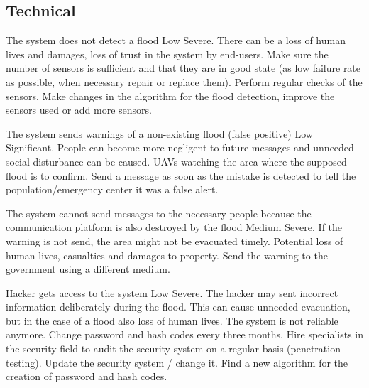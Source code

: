 \subsection{Technical}

{The system does not detect a flood}
{Low}
{Severe. There can be a loss of human lives and damages, loss of trust in the system by end-users.}
{Make sure the number of sensors is sufficient and that they are in good state (as low failure rate as possible, when necessary repair or replace them). Perform regular checks of the sensors.}
{Make changes in the algorithm for the flood detection, improve the sensors used or add more sensors.}

{The system sends warnings of a non-existing flood (false positive)} %
{Low}
{Significant. People can become more negligent to future messages and unneeded social disturbance can be caused.}
{UAVs watching the area where the supposed flood is to confirm.}
{Send a message as soon as the mistake is detected to tell the population/emergency center it was a false alert. }

{The system cannot send messages to the necessary people because the communication platform is also destroyed by the flood}
{Medium}
{Severe. If the warning is not send, the area might not be evacuated timely. Potential loss of human lives, casualties and damages to property. }
{}
{Send the warning to the government using a different medium.}
	

{Hacker gets access to the system}
{Low}
{Severe. The hacker may sent incorrect information deliberately during the flood. This can cause unneeded evacuation, but in the case of a flood also loss of human lives. The system is not reliable anymore.}
{Change password and hash codes every three months. Hire specialists in the security field to audit the security system on a regular basis (penetration testing).}
{Update the security system / change it. Find a new algorithm for the creation of password and hash codes.}



